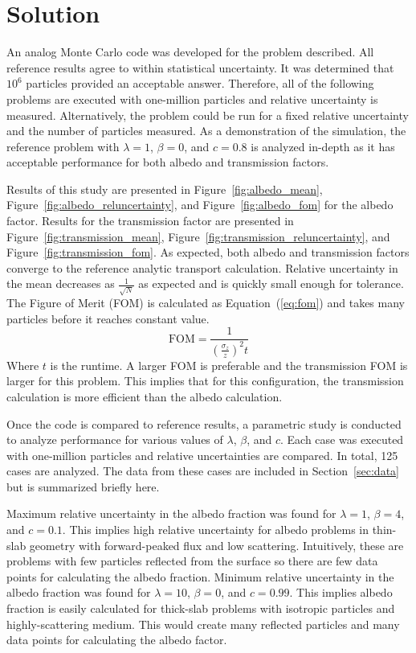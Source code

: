 \documentclass{article}
\newcommand{\fref}[1]{Figure~\ref{#1}}
\newcommand{\eref}[1]{Equation~(\ref{#1})}
\newcommand{\sref}[1]{Section~\ref{#1}}
\begin{document}
\section{Solution}
  An analog Monte Carlo code was developed for the problem described. All
  reference results agree to within statistical uncertainty. It was determined
  that $10^6$ particles provided an acceptable answer. Therefore, all of the
  following problems are executed with one-million particles and relative
  uncertainty is measured. Alternatively, the problem could be run for a fixed
  relative uncertainty and the number of particles measured. As a demonstration
  of the simulation, the reference problem with $\lambda = 1$, $\beta = 0$, and
  $c = 0.8$ is analyzed in-depth as it has acceptable performance for both
  albedo and transmission factors.

  Results of this study are presented in \fref{fig:albedo_mean}, 
  \fref{fig:albedo_reluncertainty}, and \fref{fig:albedo_fom} for the albedo
  factor. Results for the transmission factor are presented in
  \fref{fig:transmission_mean}, \fref{fig:transmission_reluncertainty}, and
  \fref{fig:transmission_fom}. As expected, both albedo and transmission factors
  converge to the reference analytic transport calculation. Relative uncertainty
  in the mean decreases as $\frac{1}{\sqrt{N}}$ as expected and is quickly small
  enough for tolerance. The Figure of Merit (FOM) is calculated as \eref{eq:fom}
  and takes many particles before it reaches constant value.
  \begin{equation}
    \label{eq:fom}
    \text{FOM} = \frac{1}{\left(\frac{\sigma_z}{z}\right)^2 t}
  \end{equation}
  Where $t$ is the runtime. A larger FOM is preferable and the transmission FOM
  is larger for this problem. This implies that for this configuration, the
  transmission calculation is more efficient than the albedo calculation.

  Once the code is compared to reference results, a parametric study is
  conducted to analyze performance for various values of $\lambda$, $\beta$, and
  $c$. Each case was executed with one-million particles and relative
  uncertainties are compared. In total, 125 cases are analyzed. The data from
  these cases are included in \sref{sec:data} but is summarized briefly here.

  Maximum relative uncertainty in the albedo fraction was found for 
  $\lambda = 1$, $\beta = 4$, and $c = 0.1$. This implies high relative
  uncertainty for albedo problems in thin-slab geometry with forward-peaked flux
  and low scattering. Intuitively, these are problems with few particles
  reflected from the surface so there are few data points for calculating the
  albedo fraction. Minimum relative uncertainty in the albedo fraction was found
  for $\lambda = 10$, $\beta = 0$, and $c = 0.99$. This implies albedo fraction
  is easily calculated for thick-slab problems with isotropic particles and
  highly-scattering medium. This would create many reflected particles and many
  data points for calculating the albedo factor.
\end{document}
